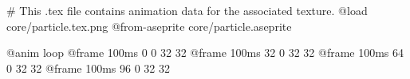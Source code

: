 # This .tex file contains animation data for the associated texture.
@load core/particle.tex.png
@from-aseprite core/particle.aseprite

@anim loop
	@frame 100ms 0 0 32 32
	@frame 100ms 32 0 32 32
	@frame 100ms 64 0 32 32
	@frame 100ms 96 0 32 32
